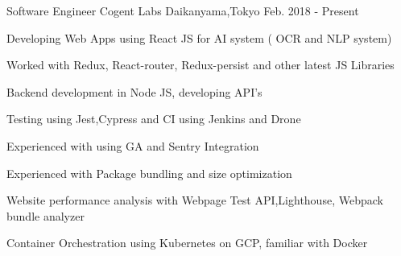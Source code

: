 \begin{cventries}


  \cventry
    {Software Engineer}
    {Cogent Labs}
    {Daikanyama,Tokyo}
    {Feb. 2018 - Present}
    {
      \begin{cvitems}
        \item {Developing Web Apps using React JS for AI system ( OCR and NLP system) }
        \item {Worked with Redux, React-router, Redux-persist and other latest JS Libraries}
        \item { Backend development in Node JS, developing API's }
        \item {Testing using Jest,Cypress and CI using Jenkins and Drone}
        \item {Experienced with using GA and Sentry Integration}
        \item {Experienced with Package bundling and size optimization}
        \item {Website performance analysis with Webpage Test API,Lighthouse, Webpack bundle analyzer}
        \item {Container Orchestration using Kubernetes on GCP, familiar with Docker}
      \end{cvitems}
    }
    

\end{cventries}
